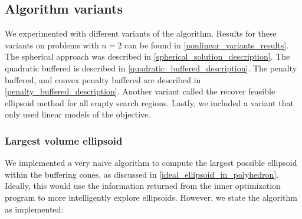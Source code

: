 \subsection{Algorithm variants}

We experimented with different variants of the algorithm.
Results for these variants on problems with $n=2$ can be found in \cref{nonlinear_variants_results}.
The spherical approach was described in \cref{spherical_solution_description}.
The quadratic buffered is described in \cref{quadratic_buffered_description}.
The penalty buffered, and convex penalty buffered are described in \cref{penalty_buffered_description}.
Another variant called the recover feasible ellipsoid method for all empty search regions.
Lastly, we included a variant that only used linear models of the objective.

\subsubsection{Largest volume ellipsoid}
We implemented a very naive algorithm to compute the largest possible ellipsoid within the buffering cones, as discussed in \cref{ideal_ellipsoid_in_polyhedron}.
Ideally, this would use the information returned from the inner optimization program to more intelligently explore ellipsoids.
However, we state the algorithm as implemented:

